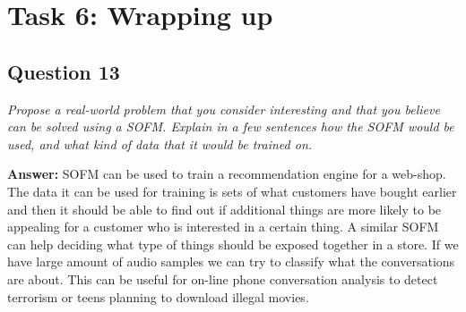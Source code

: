\documentclass[a4paper]{article}
\begin{document}
\section*{Task 6: Wrapping up}

\subsection*{Question 13}
\emph{Propose a real-world problem that you consider interesting and
that you believe can be solved using a SOFM. Explain in a few sentences how the
SOFM would be used, and what kind of data that it would be trained on.}

\textbf{Answer:} SOFM can be used to train a recommendation engine for a web-shop. The data it can be used for training is sets of what customers have bought earlier and then it should be able to find out if additional things are more likely to be appealing for a customer who is interested in a certain thing. 
A similar SOFM can help deciding what type of things should be exposed together in a store. 
If we have large amount of audio samples we can try to classify what the conversations are about. This can be useful for on-line phone conversation analysis to detect terrorism or teens planning to download illegal movies. 
\end{document}
